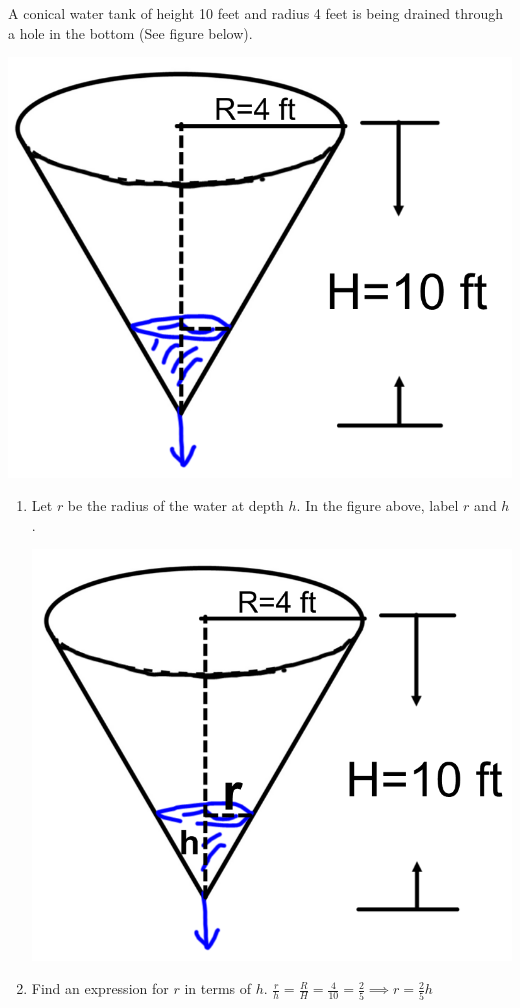 \documentclass[nooutcomes,handout]{ximera}
\begin{document}
\begin{problem}
A conical water tank of height 10 feet and radius 4 feet is being drained through a hole in the bottom (See figure below).   
		\begin{image}
		\includegraphics[scale=.4]{Figure14.png}
		\end{image}

\begin{enumerate}
	\item Let $r$ be the radius of the water at depth $h$.  In the figure above, label $r$ and $h$.
		\begin{freeResponse} \hfil
		\begin{image}
		\includegraphics[scale=.3]{Figure15.png}
		\end{image}
		\end{freeResponse}	
	\item Find an expression for $r$ in terms of $h$.
	$\frac{r}{h}=\frac{R}{H}=\frac{4}{10}=\frac{2}{5} \implies r=\frac{2}{5}h$
	

\end{enumerate}
\end{problem}
\end{document}
